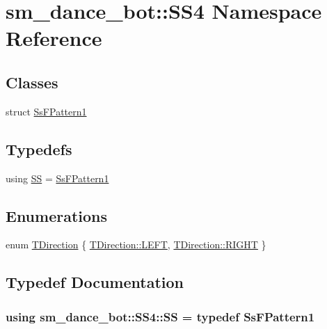 \hypertarget{namespacesm__dance__bot_1_1SS4}{}\section{sm\+\_\+dance\+\_\+bot\+:\+:S\+S4 Namespace Reference}
\label{namespacesm__dance__bot_1_1SS4}
\subsection*{Classes}
\begin{DoxyCompactItemize}
\item 
struct \hyperlink{structsm__dance__bot_1_1SS4_1_1SsFPattern1}{Ss\+F\+Pattern1}
\end{DoxyCompactItemize}
\subsection*{Typedefs}
\begin{DoxyCompactItemize}
\item 
using \hyperlink{namespacesm__dance__bot_1_1SS4_af98ef8a59275a60f9f3b2e3159fd625d}{SS} = \hyperlink{structsm__dance__bot_1_1SS4_1_1SsFPattern1}{Ss\+F\+Pattern1}
\end{DoxyCompactItemize}
\subsection*{Enumerations}
\begin{DoxyCompactItemize}
\item 
enum \hyperlink{namespacesm__dance__bot_1_1SS4_a8cc908c11b286e3f0591930361cc427e}{T\+Direction} \{ \hyperlink{namespacesm__dance__bot_1_1SS4_a8cc908c11b286e3f0591930361cc427ea684d325a7303f52e64011467ff5c5758}{T\+Direction\+::\+L\+E\+FT}, 
\hyperlink{namespacesm__dance__bot_1_1SS4_a8cc908c11b286e3f0591930361cc427ea21507b40c80068eda19865706fdc2403}{T\+Direction\+::\+R\+I\+G\+HT}
 \}
\end{DoxyCompactItemize}


\subsection{Typedef Documentation}
\subsubsection[{\texorpdfstring{SS}{SS}}]{\setlength{\rightskip}{0pt plus 5cm}using {\bf sm\+\_\+dance\+\_\+bot\+::\+S\+S4\+::\+SS} = typedef {\bf Ss\+F\+Pattern1}}\hypertarget{namespacesm__dance__bot_1_1SS4_af98ef8a59275a60f9f3b2e3159fd625d}{}\label{namespacesm__dance__bot_1_1SS4_af98ef8a59275a60f9f3b2e3159fd625d}


